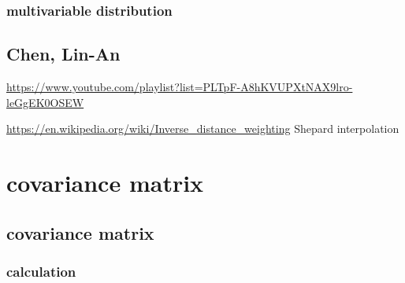\documentclass[
]{book}
\theoremstyle{definition}
\theoremstyle{definition}
\theoremstyle{definition}
\theoremstyle{definition}
\theoremstyle{remark}
\begin{document}
\subsection{multivariable distribution}\label{multivariable-distribution}

\section{Chen, Lin-An}\label{chen-lin-an}

\url{https://www.youtube.com/playlist?list=PLTpF-A8hKVUPXtNAX9lro-leGgEK0OSEW}

\url{https://en.wikipedia.org/wiki/Inverse_distance_weighting} Shepard interpolation

\chapter{covariance matrix}\label{covariance-matrix}

\section{covariance matrix}\label{covariance-matrix-1}

\textsuperscript{}

\subsection{calculation}\label{calculation}
\end{document}
